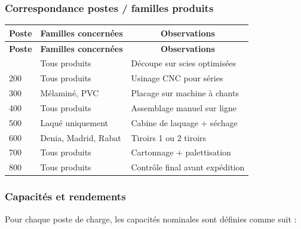 \documentclass[12pt,a4paper]{article}
\begin{document}
\subsubsection{Correspondance postes / familles produits}

\begin{longtable}{|p{2.5cm}|p{5cm}|p{8cm}|}
\hline
\multicolumn{1}{|c|}{\textbf{Poste}} & \multicolumn{1}{c|}{\textbf{Familles concernées}} & \multicolumn{1}{c|}{\textbf{Observations}} \\
\hline
\endfirsthead
\hline
\multicolumn{1}{|c|}{\textbf{Poste}} & \multicolumn{1}{c|}{\textbf{Familles concernées}} & \multicolumn{1}{c|}{\textbf{Observations}} \\
\hline
\endhead
\hline
\endfoot
100 & Tous produits & Découpe sur scies optimisées \\
200 & Tous produits & Usinage CNC pour séries \\
300 & Mélaminé, PVC & Placage sur machine à chants \\
400 & Tous produits & Assemblage manuel sur ligne \\
500 & Laqué uniquement & Cabine de laquage + séchage \\
600 & Denia, Madrid, Rabat & Tiroirs 1 ou 2 tiroirs \\
700 & Tous produits & Cartonnage + palettisation \\
800 & Tous produits & Contrôle final avant expédition \\
\hline
\end{longtable}

\subsubsection{Capacités et rendements}

Pour chaque poste de charge, les capacités nominales sont définies comme suit :
\end{document}
